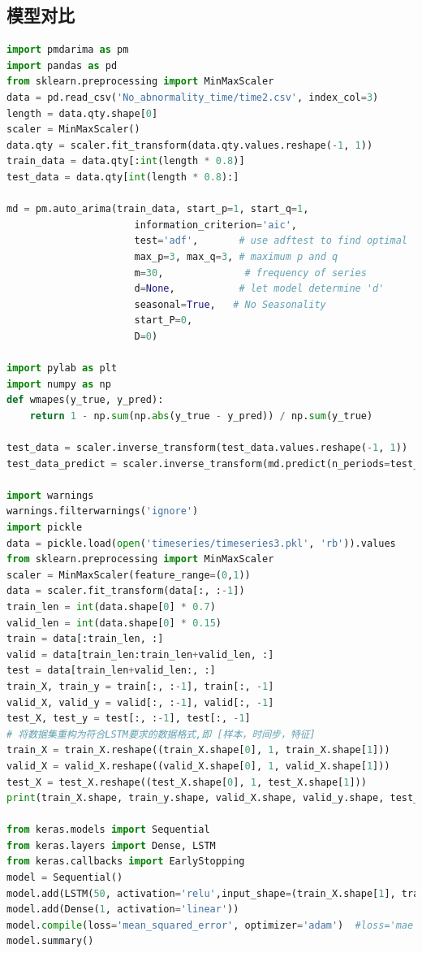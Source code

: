 \documentclass[withoutpreface,bwprint]{cumcmthesis}
\begin{document}
\subsection*{模型对比}
\begin{lstlisting}[language=python]
import pmdarima as pm
import pandas as pd
from sklearn.preprocessing import MinMaxScaler
data = pd.read_csv('No_abnormality_time/time2.csv', index_col=3)
length = data.qty.shape[0]
scaler = MinMaxScaler()
data.qty = scaler.fit_transform(data.qty.values.reshape(-1, 1))
train_data = data.qty[:int(length * 0.8)]
test_data = data.qty[int(length * 0.8):]

md = pm.auto_arima(train_data, start_p=1, start_q=1,
                      information_criterion='aic',
                      test='adf',       # use adftest to find optimal 'd'
                      max_p=3, max_q=3, # maximum p and q
                      m=30,              # frequency of series
                      d=None,           # let model determine 'd'
                      seasonal=True,   # No Seasonality
                      start_P=0, 
                      D=0)

import pylab as plt
import numpy as np
def wmapes(y_true, y_pred):
    return 1 - np.sum(np.abs(y_true - y_pred)) / np.sum(y_true)

test_data = scaler.inverse_transform(test_data.values.reshape(-1, 1))
test_data_predict = scaler.inverse_transform(md.predict(n_periods=test_data.shape[0]).values.reshape(-1, 1))

import warnings
warnings.filterwarnings('ignore')
import pickle
data = pickle.load(open('timeseries/timeseries3.pkl', 'rb')).values
from sklearn.preprocessing import MinMaxScaler
scaler = MinMaxScaler(feature_range=(0,1))
data = scaler.fit_transform(data[:, :-1])
train_len = int(data.shape[0] * 0.7)
valid_len = int(data.shape[0] * 0.15)
train = data[:train_len, :]
valid = data[train_len:train_len+valid_len, :]
test = data[train_len+valid_len:, :]
train_X, train_y = train[:, :-1], train[:, -1]
valid_X, valid_y = valid[:, :-1], valid[:, -1]
test_X, test_y = test[:, :-1], test[:, -1]
# 将数据集重构为符合LSTM要求的数据格式,即 [样本，时间步，特征]
train_X = train_X.reshape((train_X.shape[0], 1, train_X.shape[1]))
valid_X = valid_X.reshape((valid_X.shape[0], 1, valid_X.shape[1]))
test_X = test_X.reshape((test_X.shape[0], 1, test_X.shape[1]))
print(train_X.shape, train_y.shape, valid_X.shape, valid_y.shape, test_X.shape, test_y.shape)

from keras.models import Sequential
from keras.layers import Dense, LSTM
from keras.callbacks import EarlyStopping
model = Sequential()
model.add(LSTM(50, activation='relu',input_shape=(train_X.shape[1], train_X.shape[2])))
model.add(Dense(1, activation='linear'))
model.compile(loss='mean_squared_error', optimizer='adam')  #loss='mae'
model.summary()


\end{lstlisting}
\end{document}

